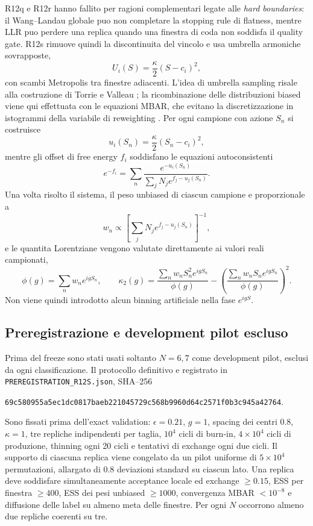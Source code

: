 \documentclass[11pt,a4paper]{article}
\begin{document}
R12q e R12r hanno fallito per ragioni complementari legate alle \emph{hard boundaries}: il Wang--Landau globale puo non completare la stopping rule di flatness, mentre LLR puo perdere una replica quando una finestra di coda non soddisfa il quality gate. R12s rimuove quindi la discontinuita del vincolo e usa umbrella armoniche sovrapposte,
\begin{equation}
 U_i(S)=\frac{\kappa}{2}(S-c_i)^2,
\end{equation}
con scambi Metropolis tra finestre adiacenti. L'idea di umbrella sampling risale alla costruzione di Torrie e Valleau \cite{TorrieValleau1977}; la ricombinazione delle distribuzioni biased viene qui effettuata con le equazioni MBAR, che evitano la discretizzazione in istogrammi della variabile di reweighting \cite{ShirtsChodera2008}. Per ogni campione con azione $S_n$ si costruisce
\begin{equation}
 u_i(S_n)=\frac{\kappa}{2}(S_n-c_i)^2,
\end{equation}
mentre gli offset di free energy $f_i$ soddisfano le equazioni autoconsistenti
\begin{equation}
 e^{-f_i}
 =\sum_n
 \frac{e^{-u_i(S_n)}}{\sum_j N_j e^{f_j-u_j(S_n)}}.
\end{equation}
Una volta risolto il sistema, il peso unbiased di ciascun campione e proporzionale a
\begin{equation}
 w_n\propto
 \left[\sum_j N_j e^{f_j-u_j(S_n)}\right]^{-1},
\end{equation}
e le quantita Lorentziane vengono valutate direttamente ai valori reali campionati,
\begin{equation}
 \phi(g)=\sum_n w_n e^{igS_n},\qquad
 \kappa_2(g)=\frac{\sum_n w_n S_n^2 e^{igS_n}}{\phi(g)}
 -\left(\frac{\sum_n w_n S_n e^{igS_n}}{\phi(g)}\right)^2.
\end{equation}
Non viene quindi introdotto alcun binning artificiale nella fase $e^{igS}$.

\subsection{Preregistrazione e development pilot escluso}

Prima del freeze sono stati usati soltanto $N=6,7$ come development pilot, esclusi da ogni classificazione. Il protocollo definitivo e registrato in \texttt{PREREGISTRATION\_R12S.json}, SHA--256
\begin{center}
\texttt{69c580955a5ec1dc0817baeb221045729c568b9960d64c2571f0b3c945a42764}.
\end{center}
Sono fissati prima dell'exact validation: $\epsilon=0.21$, $g=1$, spacing dei centri $0.8$, $\kappa=1$, tre repliche indipendenti per taglia, $10^4$ cicli di burn-in, $4\times10^4$ cicli di produzione, thinning ogni 20 cicli e tentativi di exchange ogni due cicli. Il supporto di ciascuna replica viene congelato da un pilot uniforme di $5\times10^4$ permutazioni, allargato di $0.8$ deviazioni standard su ciascun lato. Una replica deve soddisfare simultaneamente acceptance locale ed exchange $\geq0.15$, ESS per finestra $\geq400$, ESS dei pesi unbiased $\geq1000$, convergenza MBAR $<10^{-8}$ e diffusione delle label su almeno meta delle finestre. Per ogni $N$ occorrono almeno due repliche coerenti su tre.
\end{document}
